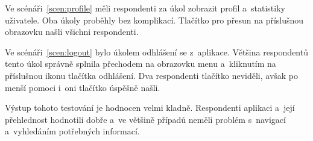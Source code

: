Ve scénáři~\ref{scen:profile} měli respondenti za úkol zobrazit profil
a~statistiky \mbox{uživatele}.
Oba úkoly proběhly bez komplikací.
Tlačítko pro přesun na příslušnou obrazovku našli všichni respondenti.

Ve scénáři~\ref{scen:logout} bylo úkolem odhlášení se z~aplikace.
Většina respondentů tento úkol správně splnila přechodem na obrazovku menu
a~kliknutím na příslušnou ikonu tlačítka odhlášení.
Dva respondenti tlačítko neviděli,
avšak po menší pomoci i~oni tlačítko úspěšně našli.

Výstup tohoto testování je hodnocen velmi kladně.
Respondenti aplikaci a~její přehlednost hodnotili dobře a~ve většině případů
neměli problém s~navigací a~vyhledáním potřebných informací.